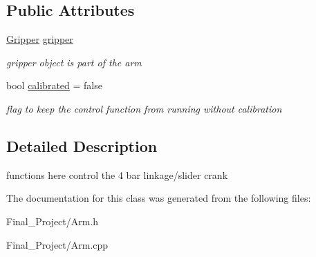 \subsection*{Public Attributes}
\begin{DoxyCompactItemize}
\item 
\hypertarget{classArm_a1f237e56fc1e76c2b63f1f59d847945d}{\hyperlink{classGripper}{Gripper} \hyperlink{classArm_a1f237e56fc1e76c2b63f1f59d847945d}{gripper}}\label{classArm_a1f237e56fc1e76c2b63f1f59d847945d}

\begin{DoxyCompactList}\small\item\em gripper object is part of the arm \end{DoxyCompactList}\item 
\hypertarget{classArm_a3f6c85e5a8feacd8870b653a8163d99f}{bool \hyperlink{classArm_a3f6c85e5a8feacd8870b653a8163d99f}{calibrated} = false}\label{classArm_a3f6c85e5a8feacd8870b653a8163d99f}

\begin{DoxyCompactList}\small\item\em flag to keep the control function from running without calibration \end{DoxyCompactList}\end{DoxyCompactItemize}


\subsection{Detailed Description}
functions here control the 4 bar linkage/slider crank 

The documentation for this class was generated from the following files\-:\begin{DoxyCompactItemize}
\item 
Final\-\_\-\-Project/Arm.\-h\item 
Final\-\_\-\-Project/Arm.\-cpp\end{DoxyCompactItemize}
